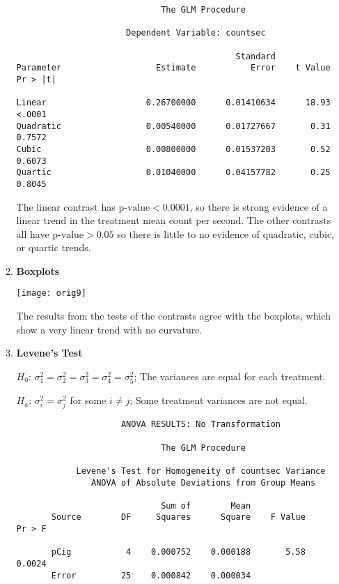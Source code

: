 \documentclass[11pt]{article}
\begin{document}
\begin{enumerate}
\begin{enumerate}
\begin{verbatim}
                             The GLM Procedure
 
                      Dependent Variable: countsec   

                                            Standard
Parameter                   Estimate           Error    t Value    Pr > |t|

Linear                    0.26700000      0.01410634      18.93      <.0001
Quadratic                 0.00540000      0.01727667       0.31      0.7572
Cubic                     0.00800000      0.01537203       0.52      0.6073
Quartic                   0.01040000      0.04157782       0.25      0.8045
\end{verbatim}

The linear contrast has \(\text{p-value}<0.0001\), so there is strong evidence
of a linear trend in the treatment mean count per second. The other contrasts
all have \(\text{p-value}>0.05\) so there is little to no evidence of quadratic,
cubic, or quartic trends.

\item %
\textbf{Boxplots}

\begin{center}\texttt{[image: orig9]}\end{center}

The results from the tests of the contrasts agree with the boxplots, which show
a very linear trend with no curvature.

\pagebreak
\item %
\textbf{Levene's Test}

\(H_0\): \(\sigma^2_1=\sigma^2_2=\sigma^2_3=\sigma^2_4=\sigma^2_5\); The
variances are equal for each treatment.

\(H_a\): \(\sigma^2_i=\sigma^2_j\) for some \(i\neq j\); Some treatment
variances are not equal.

\begin{verbatim}
                     ANOVA RESULTS: No Transformation

                             The GLM Procedure

            Levene's Test for Homogeneity of countsec Variance
               ANOVA of Absolute Deviations from Group Means
 
                             Sum of        Mean
       Source        DF     Squares      Square    F Value    Pr > F

       pCig           4    0.000752    0.000188       5.58    0.0024
       Error         25    0.000842    0.000034                     
\end{verbatim}


\end{enumerate}
\end{enumerate}
\end{document}
